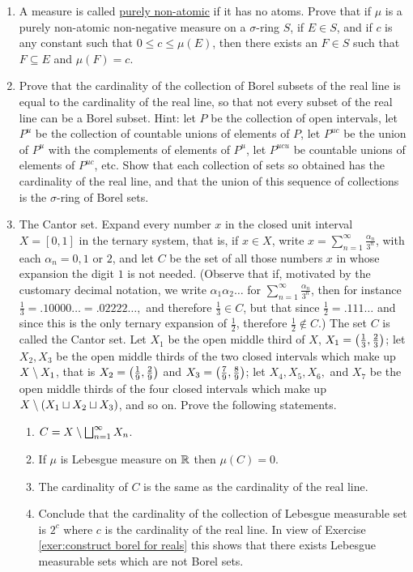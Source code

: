 \begin{enumerate}[label=\arabic*),ref=\arabic*]
\item \label{exer:non atomic measure}
A measure is called \underline{purely non-atomic} if it has no atoms. Prove that if $\mu$ is a purely non-atomic non-negative measure on a $\sigma$-ring $S$, if $E \in S$, and if $c$ is any constant such that $0 \leq c\leq \mu(E)$, then there exists an $F \in S$ such that $F \subseteq E$ and $\mu(F)=c$.

\item \label{exer:construct borel for reals}
Prove that the cardinality of the collection of Borel subsets of the real line is equal to the cardinality of the real line, so that not every subset of the real line can be a Borel subset. Hint: let $P$ be the collection of open intervals, let $P^u$ be the collection of countable unions of elements of $P$, let $P^{uc}$ be the union of $P^u$ with the complements of elements of $P^u$, let $P^{ucu}$ be countable unions of elements of $P^{uc}$, etc. Show that each collection of sets so obtained has the cardinality of the real line, and that the union of this sequence of collections is the $\sigma$-ring of Borel sets.

\item \label{exer:cantor set}
The Cantor set. Expand every number $x$ in the closed unit interval $X=[0,1]$ in the ternary system, that is, if $x\in X$, write $x=\sum_{n=1}^\infty\frac{\alpha_n}{3^n}$, with each $\alpha_n=0,1$ or $2$, and let $C$ be the set of all those numbers $x$ in whose expansion the digit $1$ is not needed. (Observe that if, motivated by the customary decimal notation, we write $\alpha_1\alpha_2\dots$ for $\sum_{n=1}^\infty\frac{\alpha_n}{3^n}$, then for instance $\frac13=.10000\dots=.02222\dots,$ and therefore $\frac13\in C$, but that since $\frac12=.111\dots$ and since this is the only ternary expansion of $\frac12$, therefore $\frac12\notin C$.) The set $C$ is called the Cantor set. Let $X_1$ be the open middle third of $X$, $X_1=\left(\frac13,\frac23\right)$; let $X_2,X_3$ be the open middle thirds of the two closed intervals which make up $X\setminus X_1$, that is $X_2=\left(\frac19,\frac29\right)$ and $X_3=\left(\frac79,\frac89\right)$; let $X_4,X_5,X_6,$ and $X_7$ be the open middle thirds of the four closed intervals which make up $X\setminus(X_1\sqcup X_2\sqcup X_3)$, and so on. Prove the following statements.
\begin{enumerate}
\item $C=X\setminus\bigsqcup_{n=1}^\infty X_n$.
\item If $\mu$ is Lebesgue measure on $\mathbb{R}$ then $\mu(C)=0$.
\item The cardinality of $C$ is the same as the cardinality of the real line.
\item Conclude that the cardinality of the collection of Lebesgue measurable set is $2^c$ where $c$ is the cardinality of the real line. In view of Exercise \ref{exer:construct borel for reals} this shows that there exists Lebesgue measurable sets which are not Borel sets.
\end{enumerate}


\end{enumerate}
